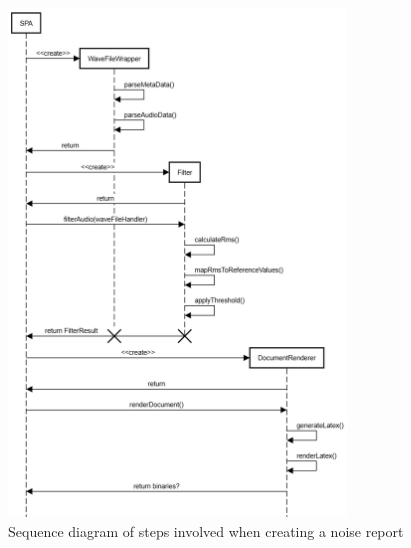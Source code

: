 \begin{figure}[H]
    \centering
    \includegraphics[width=0.8\textwidth]{../assets/sequence_diagram_from_wave_file_to_pdf.png}
    \caption{Sequence diagram of steps involved when creating a noise report}
\end{figure}

